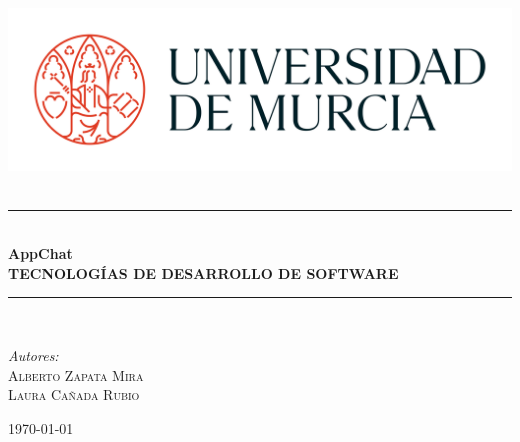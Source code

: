\begin{titlepage}
    \begin{center}
    
    \includegraphics[width=\textwidth]{images/LogosimboloUMU-positivo.png}\\[1cm]
    
    \textsc{\Large }\\[0.5cm]
    
    \rule{\linewidth}{0.5mm} \\[0.4cm]
    
    {\huge \bfseries AppChat\\[0.2cm]
    TECNOLOGÍAS DE DESARROLLO DE SOFTWARE \\[0.4cm] }
    
    \rule{\linewidth}{0.5mm} \\[1.5cm]
    
    \begin{minipage}{0.4\textwidth}
    \begin{flushleft} \large
    \emph{Autores:}\\
    \textsc{Alberto Zapata Mira}\\
    \textsc{Laura Cañada Rubio}\\
    \end{flushleft}
    \end{minipage}
    
    \vfill
    
    {\large \today}
    
    \end{center}
    \end{titlepage}